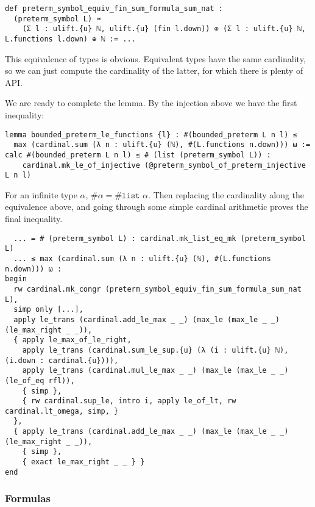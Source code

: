 \documentclass{article}
\newcommand{\al}{\alpha}
\newcommand{\<}{\langle}
\renewcommand{\>}{\rangle}
\theoremstyle{definitionstyle}
\theoremstyle{exercisestyle}
\theoremstyle{remarkstyle}
\begin{document}
\begin{lstlisting}
def preterm_symbol_equiv_fin_sum_formula_sum_nat :
  (preterm_symbol L) ≃
    (Σ l : ulift.{u} ℕ, ulift.{u} (fin l.down)) ⊕ (Σ l : ulift.{u} ℕ, L.functions l.down) ⊕ ℕ := ... \end{lstlisting}

This equivalence of types is obvious.
Equivalent types have the same cardinality, so
we can just compute the cardinality of the latter,
for which there is plenty of API.

We are ready to complete the lemma.
By the injection above we have the first inequality:
\begin{lstlisting}
lemma bounded_preterm_le_functions {l} : #(bounded_preterm L n l) ≤
  max (cardinal.sum (λ n : ulift.{u} (ℕ), #(L.functions n.down))) ω :=
calc #(bounded_preterm L n l) ≤ # (list (preterm_symbol L)) :
    cardinal.mk_le_of_injective (@preterm_symbol_of_preterm_injective L n l)
\end{lstlisting}
For an infinite type $\al$, $\# \al = \# \texttt{list } \al$.
Then replacing the cardinality along the equivalence above,
and going through some simple cardinal arithmetic proves the final inequality.
\begin{lstlisting}
  ... = # (preterm_symbol L) : cardinal.mk_list_eq_mk (preterm_symbol L)
  ... ≤ max (cardinal.sum (λ n : ulift.{u} (ℕ), #(L.functions n.down))) ω :
begin
  rw cardinal.mk_congr (preterm_symbol_equiv_fin_sum_formula_sum_nat L),
  simp only [...],
  apply le_trans (cardinal.add_le_max _ _) (max_le (max_le _ _) (le_max_right _ _)),
  { apply le_max_of_le_right,
    apply le_trans (cardinal.sum_le_sup.{u} (λ (i : ulift.{u} ℕ), (i.down : cardinal.{u}))),
    apply le_trans (cardinal.mul_le_max _ _) (max_le (max_le _ _) (le_of_eq rfl)),
    { simp },
    { rw cardinal.sup_le, intro i, apply le_of_lt, rw cardinal.lt_omega, simp, }
  },
  { apply le_trans (cardinal.add_le_max _ _) (max_le (max_le _ _) (le_max_right _ _)),
    { simp },
    { exact le_max_right _ _ } }
end \end{lstlisting}

\subsubsection{Formulas}
\end{document}
